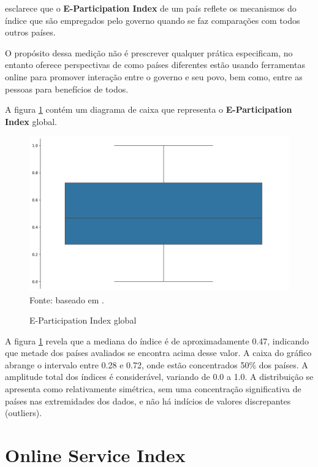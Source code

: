 \cite{ONU_EGDI} esclarece que o \textbf{E-Participation Index} de um país reflete os mecanismos do índice que são empregados pelo governo quando se faz comparações com todos outros países. 

O propósito dessa medição não é prescrever qualquer prática especificam, no entanto oferece perspectivas de como países diferentes estão usando ferramentas online para promover interação entre o governo e seu povo, bem como, entre as pessoas para benefícios de todos.

A figura \ref{fig:boxplot_epart_global} contém um diagrama de caixa que representa o \textbf{E-Participation Index} global.

\begin{figure}[H]
	\centering
	\caption{E-Participation Index global}
	\includegraphics[width=1\linewidth]{figuras/egdi/boxplot_epart_global.png}
	\label{fig:boxplot_epart_global}
	\footnotesize{Fonte: baseado em \cite{ONU_EGDI_mapa}.}
\end{figure}

A figura \ref{fig:boxplot_epart_global} revela que a mediana do índice é de aproximadamente 0.47, indicando que metade dos países avaliados se encontra acima desse valor. A caixa do gráfico abrange o intervalo entre 0.28 e 0.72, onde estão concentrados 50\% dos países. A amplitude total dos índices é considerável, variando de 0.0 a 1.0. A distribuição se apresenta como relativamente simétrica, sem uma concentração significativa de países nas extremidades dos dados, e não há indícios de valores discrepantes (outliers).

\section{Online Service Index}
\label{osi}

